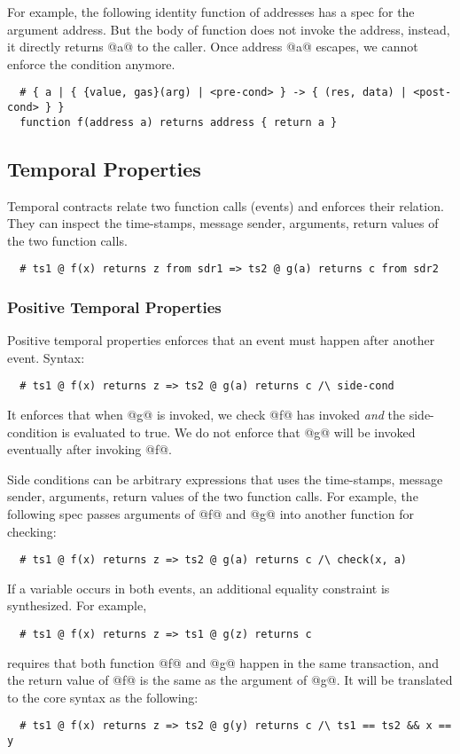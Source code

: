 \documentclass[acmsmall,review,anonymous]{acmart}\settopmatter{printfolios=true,printccs=false,printacmref=false}
\begin{document}
For example, the following identity function of addresses has a spec
for the argument address. But the body of function does not invoke
the address, instead, it directly returns @a@ to the caller.
Once address @a@ escapes, we cannot enforce the condition anymore.

\begin{lstlisting}
  # { a | { {value, gas}(arg) | <pre-cond> } -> { (res, data) | <post-cond> } }
  function f(address a) returns address { return a }
\end{lstlisting}

\subsection{Temporal Properties}

Temporal contracts relate two function calls (events) and enforces their
relation.
They can inspect the time-stamps, message sender, arguments, return values
of the two function calls.

\begin{lstlisting}
  # ts1 @ f(x) returns z from sdr1 => ts2 @ g(a) returns c from sdr2
\end{lstlisting}

\subsubsection{Positive Temporal Properties}

Positive temporal properties enforces that an event must happen
after another event. Syntax:
\begin{lstlisting}
  # ts1 @ f(x) returns z => ts2 @ g(a) returns c /\ side-cond
\end{lstlisting}
It enforces that when @g@ is invoked, we check @f@ has invoked \emph{and}
the side-condition is evaluated to true.
We do not enforce that @g@ will be invoked eventually after invoking @f@.

Side conditions can be arbitrary expressions that uses the time-stamps, message
sender, arguments, return values of the two function calls.
For example, the following spec passes arguments of @f@ and @g@ into
another function for checking:

\begin{lstlisting}
  # ts1 @ f(x) returns z => ts2 @ g(a) returns c /\ check(x, a)
\end{lstlisting}

If a variable occurs in both events, an additional equality constraint
is synthesized.  For example,
\begin{lstlisting}
  # ts1 @ f(x) returns z => ts1 @ g(z) returns c
\end{lstlisting}
requires that both function @f@ and @g@ happen in the same transaction,
and the return value of @f@ is the same as the argument of @g@.
It will be translated to the core syntax as the following:
\begin{lstlisting}
  # ts1 @ f(x) returns z => ts2 @ g(y) returns c /\ ts1 == ts2 && x == y
\end{lstlisting}
\end{document}
